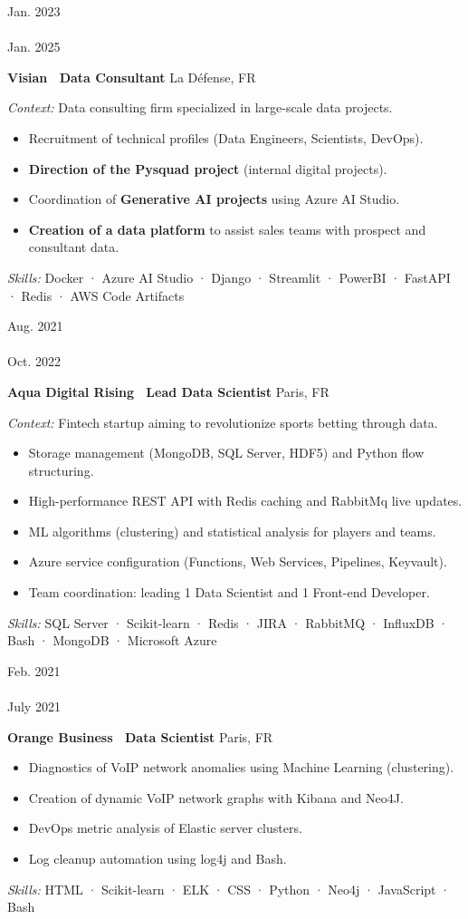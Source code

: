 \documentclass[10pt, a4paper]{article}
\newcommand{\firstcolwidth}{65pt}
\newcommand{\spaceaftersection}{0.8em}
\newcommand{\newsectionspace}{
    \begin{minipage}[t]{\linegoal}
        \hfill
        \vspace{\spaceaftersection}
    \end{minipage}
}
\newcommand{\experience}[6]{
    \begin{minipage}[t]{\firstcolwidth}
        \footnotesize{#1 \\ \textemdash \\ #2}
    \end{minipage}
    \begin{minipage}[t]{\linegoal}
        \textbf{\normalsize{#3 \textemdash\ #4}}
        \hfill
        \footnotesize{#5}
        \begin{singlespace}
            \begin{flushleft}
                \footnotesize{#6}
            \end{flushleft}
        \end{singlespace}
    \end{minipage}
}
\begin{document}
    \newsectionspace
    \experience{Jan. 2023}{Jan. 2025}{Visian}{Data Consultant}{La Défense, FR}{
        \textit{Context:} Data consulting firm specialized in large-scale data projects.
        \begin{itemize}[nosep, leftmargin=*]
            \item Recruitment of technical profiles (Data Engineers, Scientists, DevOps).
            \item \textbf{Direction of the Pysquad project} (internal digital projects).
            \item Coordination of \textbf{Generative AI projects} using Azure AI Studio.
            \item \textbf{Creation of a data platform} to assist sales teams with prospect and consultant data.
        \end{itemize}
        \textit{Skills:} Docker · Azure AI Studio · Django · Streamlit · PowerBI · FastAPI · Redis · AWS Code Artifacts
    }

    \newsectionspace
    \experience{Aug. 2021}{Oct. 2022}{Aqua Digital Rising}{Lead Data Scientist}{Paris, FR}{
        \textit{Context:} Fintech startup aiming to revolutionize sports betting through data.
        \begin{itemize}[nosep, leftmargin=*]
            \item Storage management (MongoDB, SQL Server, HDF5) and Python flow structuring.
            \item High-performance REST API with Redis caching and RabbitMq live updates.
            \item ML algorithms (clustering) and statistical analysis for players and teams.
            \item Azure service configuration (Functions, Web Services, Pipelines, Keyvault). 
            \item Team coordination: leading 1 Data Scientist and 1 Front-end Developer.
        \end{itemize}
        \textit{Skills:} SQL Server · Scikit-learn · Redis · JIRA · RabbitMQ · InfluxDB · Bash · MongoDB · Microsoft Azure
    }

    \newsectionspace
    \experience{Feb. 2021}{July 2021}{Orange Business}{Data Scientist}{Paris, FR}{
        \begin{itemize}[nosep, leftmargin=*]
            \item Diagnostics of VoIP network anomalies using Machine Learning (clustering).
            \item Creation of dynamic VoIP network graphs with Kibana and Neo4J.
            \item DevOps metric analysis of Elastic server clusters.
            \item Log cleanup automation using log4j and Bash.
        \end{itemize}
        \textit{Skills:} HTML · Scikit-learn · ELK · CSS · Python · Neo4j · JavaScript · Bash
    }
\end{document}
